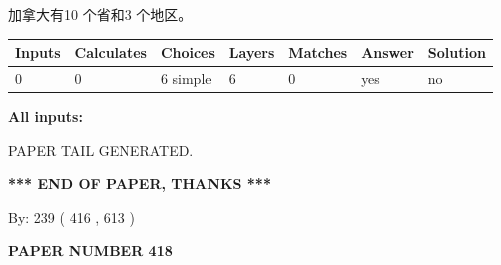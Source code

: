 \documentclass{ctexart}
\begin{document}
 
加拿大有10 个省和3 个地区。
 
 
\noindent{}
 
 
   
   
   
   
\noindent\begin{tabular}{|l|l|l|l|l|l|l|}
 \hline
Inputs & Calculates & Choices & Layers & Matches & Answer & Solution \\ \hline
 0  & 
 0  & 
 6
  simple  
  & 
 6  & 
 0  & 
  yes & 
  no 
  \\ \hline
 \end{tabular}
   
   
   
   
\noindent{}
   
   
   
   
\noindent\vspace{0.1in}\hspace{-0.08in} {\textbf{\Large{All inputs: }}}
   
   
   
   
   
   
 \vspace{0.2in}
 
   
   
\vspace{2.0in} PAPER TAIL GENERATED.
   
   
   
   
\vspace{1.0in} 
{\textbf{\large{ *** END OF PAPER, THANKS *** }}} 
   
   
\hspace{1.0in} By: 
 239 ( 416 ,  613 )
   
   
   
   
\newpage 
\setcounter{page}{ 
   418001 } 
   
   
   
   
 {\textbf{ \Large{ PAPER NUMBER  418  }}}
   
   
\vspace{0.2in}
   
   
   
   
   
   
   
\end{document}
